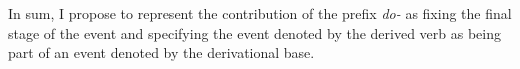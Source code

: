 In sum, I propose to represent the contribution of the prefix \textit{do-} as fixing the final stage of the event and specifying the event denoted by the derived verb as being part of an event denoted by the derivational base.


%


